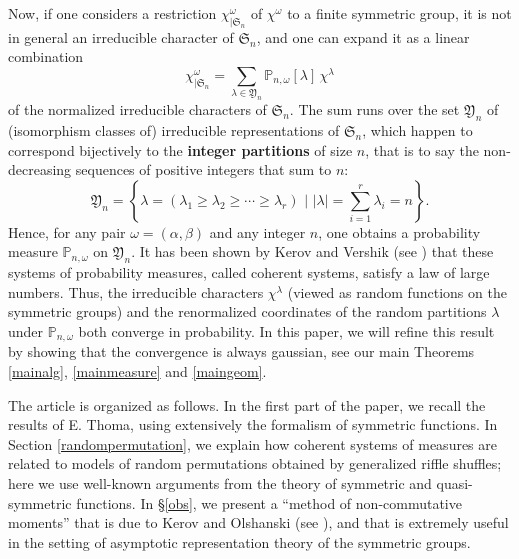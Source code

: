 \documentclass[smallextended,nospthms]{svjour3}
\theoremstyle{remark}
\newcommand{\sym}{\mathfrak{S}}
\newcommand{\ym}{\mathfrak{Y}}
\newcommand{\proba}{\mathbb{P}}
\begin{document}
Now, if one considers a restriction $\chi^{\omega}_{|\sym_{n}}$ of $\chi^{\omega}$ to a finite symmetric group, it is not in general an irreducible character of $\sym_{n}$, and one can expand it as a linear combination
$$\chi^{\omega}_{|\sym_{n}}=\sum_{\lambda\in \ym_{n}} \proba_{n,\omega}[\lambda]\,\chi^{\lambda}$$
of the normalized irreducible characters of $\sym_{n}$. The sum runs over the set $\ym_{n}$ of (isomorphism classes of) irreducible representations of $\sym_{n}$, which happen to correspond bijectively to the \textbf{integer partitions} of size $n$, that is to say the non-decreasing sequences of positive integers that sum to $n$:
$$\ym_{n}=\left\{\lambda=(\lambda_{1}\geq \lambda_{2}\geq \cdots \geq \lambda_{r})\,\,\bigg|\,\,|\lambda|=\sum_{i=1}^{r}\lambda_{i}=n\right\}.$$
Hence, for any pair $\omega=(\alpha,\beta)$ and any integer $n$, one obtains a probability measure $\proba_{n,\omega}$ on $\ym_{n}$. It has been shown by Kerov and Vershik (see \cite{KV81a,KV81b}) that these systems of probability measures, called coherent systems, satisfy a law of large numbers. Thus, the irreducible characters $\chi^{\lambda}$ (viewed as random functions on the symmetric groups) and the renormalized coordinates of the random partitions $\lambda$ under $\proba_{n,\omega}$ both converge in probability. In this paper, we will refine this result by showing that the convergence is always gaussian, see our main Theorems \ref{mainalg}, \ref{mainmeasure} and \ref{maingeom}.\bigskip\bigskip


The article is organized as follows. In the first part of the paper, we recall the results of E. Thoma, using extensively the formalism of symmetric functions. In Section \ref{randompermutation}, we explain how coherent systems of measures are related to models of random permutations obtained by generalized riffle shuffles; here we use well-known arguments from the theory of symmetric and quasi-symmetric functions. In \S\ref{obs}, we present a ``method of non-commutative moments'' that is due to Kerov and Olshanski (see \cite{KO94,IO02,Sni06b}), and that is extremely useful in the setting of asymptotic representation theory of the symmetric groups. \bigskip
\end{document}
